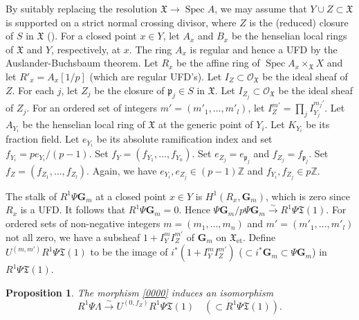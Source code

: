 \documentclass{amsart}
\newtheorem{Prop}[Thm]{Proposition}
\theoremstyle{remark}
\numberwithin{equation}{section}
\newcommand{\Order}{\mathcal{O}}
\newcommand{\isomto}{\overset{\sim}{\to}}
\newcommand{\Z}{\mathbb{Z}}
\newcommand{\et}{\mathrm{et}}
\newcommand{\Gm}{\mathbf{G}_{m}}
\newcommand{\ideal}[1]{\mathfrak{#1}}
\DeclareMathOperator{\Spec}{Spec}
\begin{document}
By suitably replacing the resolution $\mathfrak{X} \to \Spec A$,
we may assume that $Y \cup Z \subset \mathfrak{X}$ is
supported on a strict normal crossing divisor,
where $Z$ is the (reduced) closure of $S$ in $\mathfrak{X}$ (\cite[Tag 0BIC]{Sta22}).
For a closed point $x \in Y$,
let $A_{x}$ and $B_{x}$ be the henselian local rings of $\mathfrak{X}$ and $Y$, respectively, at $x$.
The ring $A_{x}$ is regular and hence a UFD
by the Auslander-Buchsbaum theorem.
Let $R_{x}$ be the affine ring of $\Spec A_{x} \times_{\mathfrak{X}} X$
and let $R'_{x} = A_{x}[1 / p]$
(which are regular UFD's).
Let $I_{Z} \subset \Order_{\mathfrak{X}}$ be the ideal sheaf of $Z$.
For each $j$, let $Z_{j}$ be the closure of $\ideal{p}_{j} \in S$ in $\mathfrak{X}$.
Let $I_{Z_{j}} \subset \Order_{\mathfrak{X}}$ be the ideal sheaf of $Z_{j}$.
For an ordered set of integers $m' = (m'_{1}, \dots, m'_{l})$,
let $I_{Z}^{m'} = \prod_{j} I_{Y_{j}}^{m_{j}'}$.
Let $A_{Y_{i}}$ be the henselian local ring of $\mathfrak{X}$
at the generic point of $Y_{i}$.
Let $K_{Y_{i}}$ be its fraction field.
Let $e_{Y_{i}}$ be its absolute ramification index
and set $f_{Y_{i}} = p e_{Y_{i}} / (p - 1)$.
Set $f_{Y} = (f_{Y_{1}}, \dots, f_{Y_{n}})$.
Set $e_{Z_{j}} = e_{\ideal{p}_{j}}$ and $f_{Z_{j}} = f_{\ideal{p}_{j}}$.
Set $f_{Z} = (f_{Z_{1}}, \dots, f_{Z_{l}})$.
Again, we have $e_{Y_{i}}, e_{Z_{j}} \in (p - 1) \Z$
and $f_{Y_{i}}, f_{Z_{j}} \in p \Z$.

The stalk of $R^{1} \Psi \Gm$ at a closed point $x \in Y$
is $H^{1}(R_{x}, \Gm)$, which is zero since $R_{x}$ is a UFD.
It follows that $R^{1} \Psi \Gm = 0$.
Hence $\Psi \Gm / p \Psi \Gm \isomto R^{1} \Psi \mathfrak{T}(1)$.
For ordered sets of non-negative integers
$m = (m_{1}, \dots, m_{n})$ and $m' = (m'_{1}, \dots, m'_{l})$ not all zero,
we have a subsheaf $1 + I_{Y}^{m} I_{Z}^{m'}$ of $\Gm$ on $\mathfrak{X}_{\et}$.
Define $U^{(m, m')} R^{1} \Psi \mathfrak{T}(1)$ to be
the image of $i^{\ast}(1 + I_{Y}^{m} I_{Z}^{m'})$ ($\subset i^{\ast} \Gm \subset \Psi \Gm$)
in $R^{1} \Psi \mathfrak{T}(1)$.

\begin{Prop}
	The morphism \eqref{0000} induces an isomorphism
		\[
				R^{1} \Psi \Lambda
			\isomto
				U^{(0, f_{Z})} R^{1} \Psi \mathfrak{T}(1)
			\quad
			(\subset
				R^{1} \Psi \mathfrak{T}(1)
			).
		\]
\end{Prop}
\end{document}
